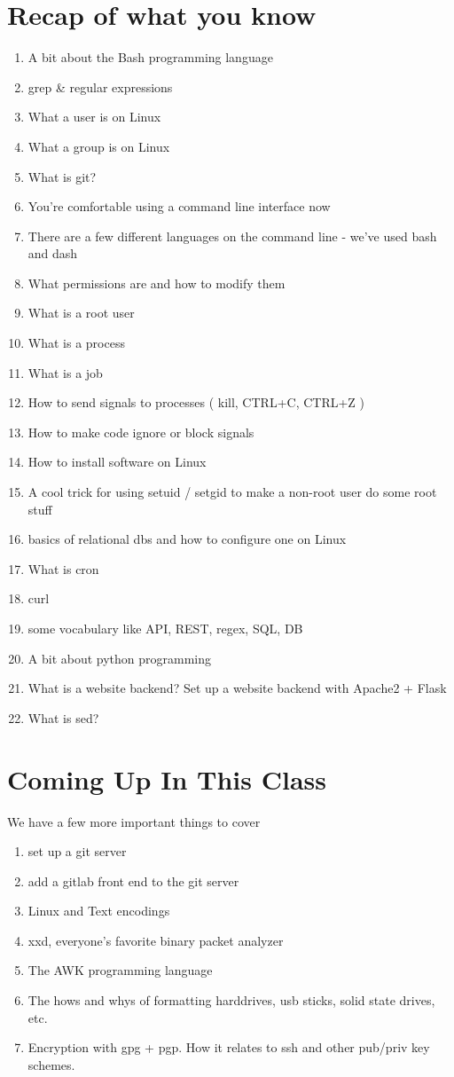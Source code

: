 \documentclass[10pt]{article}
\begin{document}
\section{Recap of what you know}
\begin{enumerate}
\item A bit about the Bash programming language
\item grep \& regular expressions
\item What a user is on Linux
\item What a group is on Linux
\item What is git?
\item You're comfortable using a command line interface now
\item There are a few different languages on the command line - we've used bash and dash
\item What permissions are and how to modify them
\item What is a root user
\item What is a process
\item What is a job
\item How to send signals to processes ( kill, CTRL+C, CTRL+Z )
\item How to make code ignore or block signals
\item How to install software on Linux
\item A cool trick for using setuid / setgid to make a non-root user do some root stuff
\item basics of relational dbs and how to configure one on Linux
\item What is cron
\item curl
\item some vocabulary like API, REST, regex, SQL, DB
\item A bit about python programming
\item What is a website backend? Set up a website backend with Apache2 + Flask
\item What is sed?
\end{enumerate}

\section{Coming Up In This Class}

We have a few more important things to cover
\begin{enumerate}
\item set up a git server
\item add a gitlab front end to the git server
\item Linux and Text encodings
\item xxd, everyone's favorite binary packet analyzer
\item The AWK programming language
\item The hows and whys of formatting harddrives, usb sticks, solid state drives, etc.
\item Encryption with gpg + pgp. How it relates to ssh and other pub/priv key schemes.
\end{enumerate}
\end{document}
